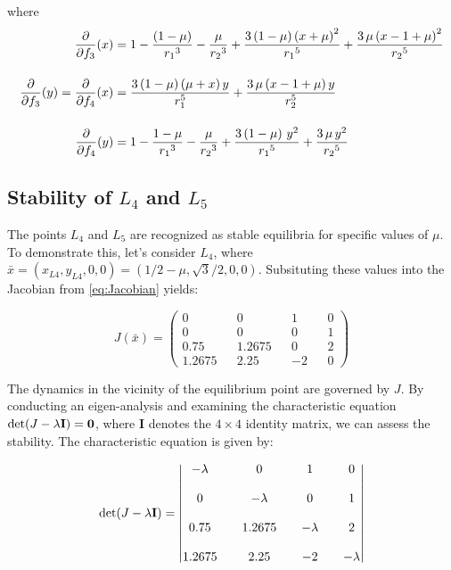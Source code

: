 \pagebreak

where
\begin{align*}
    \frac{\partial}{\partial f_3} (x)                   & = 1  - \frac{(1-\mu)}{{r_1 }^{3} } - \frac{\mu }{{r_2 }^{3} } + \frac{3\,{\left(1- \mu\right)}\,{\left(x + \mu\right)^2}}{{r_1 }^{5} } + \frac{3\,\mu \,{\left(x - 1 + \mu\right)^2}}{{r_2 }^{5} }
    \\[0.4cm]
    \frac{\partial}{\partial f_3} (y) = \frac{\partial}{\partial f_4} (x) & = \frac{3\,{\left(1-\mu\right)}\,{\left(\mu +x \right)}\,y}{r_1^{5} } + \frac{3\,\mu\,{\left(x - 1 + \mu\right)}\,y}{r_2^{5} }
    \\[0.4cm]
    \frac{\partial}{\partial f_4} (y)                   & = 1 - \frac{1 - \mu}{{r_1 }^{3} } - \frac{\mu }{{r_2}^{3} } + \frac{3 \,{\left(1 - \mu\right)\,{y }^2}}{{r_1 }^{5} }+\frac{3\,\mu \,{y }^2 }{{r_2 }^{5} }
\end{align*}

\subsection{Stability of \texorpdfstring{$L_4$ and $L_5$}{L4 and L5}}
The points $L_4$ and $L_5$ are recognized as stable equilibria for specific values of $\mu$. To demonstrate this, let's consider $L_4$, where $\bar{x} = (x_{L4}, y_{L4}, 0, 0) = (1/2 - \mu, \sqrt{3}/2, 0, 0)$. Subsituting these values into the Jacobian from \eqref{eq:Jacobian} yields:

\begin{equation*}
    J(\bar{x}) =
    \begin{pmatrix}
        0      &  & 0      &  & 1  &  & 0 \\[0.4cm]
        0      &  & 0      &  & 0  &  & 1 \\[0.4cm]
        0.75   &  & 1.2675 &  & 0  &  & 2 \\[0.4cm]
        1.2675 &  & 2.25   &  & -2 &  & 0
    \end{pmatrix}
\end{equation*}

The dynamics in the vicinity of the equilibrium point are governed by $J$. By conducting an eigen-analysis and examining the characteristic equation $\det(J-\lambda\bf{I}) = 0$, where \textbf{I} denotes the $4\times4$ identity matrix, we can assess the stability. The characteristic equation is given by:

\begin{equation*}
    \det(J-\lambda\bf{I}) =
    \left|\begin{matrix}
        -\lambda &  & 0        &  & 1        &  & 0        \\[0.4cm]
        0        &  & -\lambda &  & 0        &  & 1        \\[0.4cm]
        0.75     &  & 1.2675   &  & -\lambda &  & 2        \\[0.4cm]
        1.2675   &  & 2.25     &  & -2       &  & -\lambda
    \end{matrix}\right|
\end{equation*}


